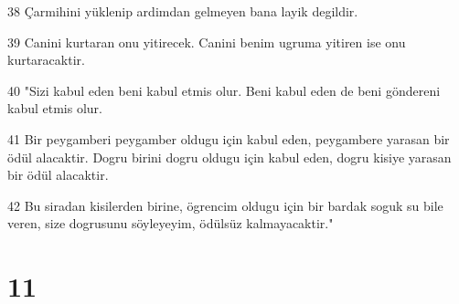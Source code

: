 \par 38 Çarmihini yüklenip ardimdan gelmeyen bana layik degildir.
\par 39 Canini kurtaran onu yitirecek. Canini benim ugruma yitiren ise onu kurtaracaktir.
\par 40 "Sizi kabul eden beni kabul etmis olur. Beni kabul eden de beni göndereni kabul etmis olur.
\par 41 Bir peygamberi peygamber oldugu için kabul eden, peygambere yarasan bir ödül alacaktir. Dogru birini dogru oldugu için kabul eden, dogru kisiye yarasan bir ödül alacaktir.
\par 42 Bu siradan kisilerden birine, ögrencim oldugu için bir bardak soguk su bile veren, size dogrusunu söyleyeyim, ödülsüz kalmayacaktir."

\chapter{11}

